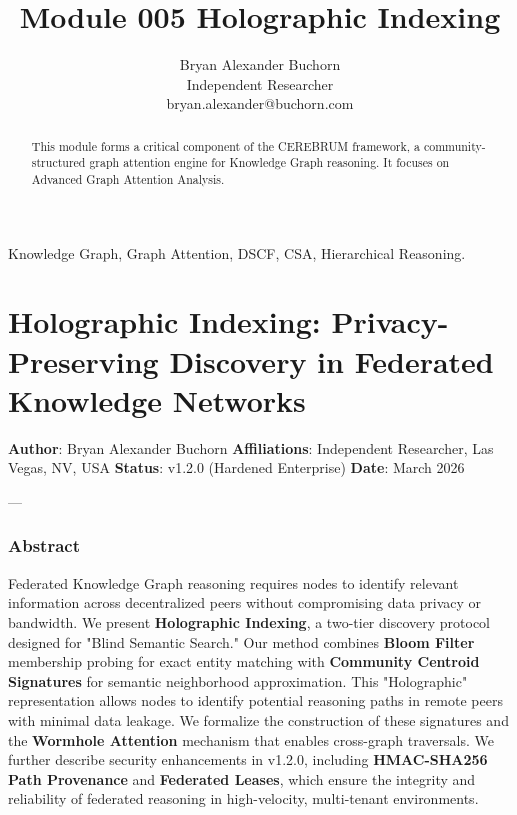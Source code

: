 \documentclass[10pt,journal,compsoc]{IEEEtran}
\begin{document}
\title{Module 005 Holographic Indexing}
\author{Bryan Alexander Buchorn \\ Independent Researcher \\ bryan.alexander@buchorn.com}

\maketitle

\begin{abstract}
This module forms a critical component of the CEREBRUM framework, a community-structured graph attention engine for Knowledge Graph reasoning. It focuses on Advanced Graph Attention Analysis.
\end{abstract}

\begin{IEEEkeywords}
Knowledge Graph, Graph Attention, DSCF, CSA, Hierarchical Reasoning.
\end{IEEEkeywords}

\section{Holographic Indexing: Privacy-Preserving Discovery in Federated Knowledge Networks}

\textbf{Author}: Bryan Alexander Buchorn  
\textbf{Affili\-ations}: Independent Researcher, Las Vegas, NV, USA  
\textbf{Status}: v1.2.0 (Hardened Enterprise)  
\textbf{Date}: March 2026

---

\subsubsection{Abstract}
Federated Knowledge Graph reasoning requires nodes to identify relevant information across decen\-tralized peers without compr\-omising data privacy or bandwidth. We present \textbf{Holographic Indexing}, a two-tier discovery protocol designed for "Blind Semantic Search." Our method combines \textbf{Bloom Filter} \cite{bloom1970} membership probing for exact entity matching with \textbf{Community Centroid Signatures} for semantic neigh\-borhood appro\-ximation. This "Holographic" repre\-sentation allows nodes to identify potential reasoning paths in remote peers with minimal data leakage. We formalize the const\-ruction of these signatures and the \textbf{Wormhole Attention} mechanism that enables cross-graph traversals. We further describe security enhan\-cements in v1.2.0, including \textbf{HMAC-SHA256 Path Provenance} \cite{gentry2009} and \textbf{Federated Leases}, which ensure the integrity and reliability of federated reasoning in high-velocity, multi-tenant envir\-onments.
\end{document}
